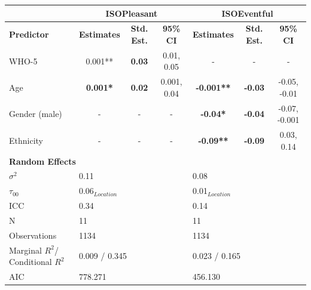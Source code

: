 \begin{landscape}
\begin{table}[hp]
    \begin{tabular}{@{}lcccccc@{}}
    \toprule
                      & \multicolumn{3}{c|}{\textbf{ISOPleasant}}                                        & \multicolumn{3}{c}{\textbf{ISOEventful}}                   \\ 
    \midrule
    \textbf{Predictor} & \textbf{Estimates} & \textbf{Std. Est.} & \multicolumn{1}{c|}{\textbf{95\% CI}} & \textbf{Estimates} & \textbf{Std. Est.} & \textbf{95\% CI} \\
    WHO-5              & 0.001**            & \textbf{0.03}      & \multicolumn{1}{c|}{0.01, 0.05}       & -                  & -                  & -                \\
    Age                & \textbf{0.001*}    & \textbf{0.02}      & \multicolumn{1}{c|}{0.001, 0.04}      & \textbf{-0.001**}  & \textbf{-0.03}     & -0.05, -0.01     \\
    Gender (male)      & -                  & -                  & \multicolumn{1}{c|}{-}                & \textbf{-0.04*}    & \textbf{-0.04}     & -0.07, -0.001    \\
    Ethnicity          & -                  & -                  & \multicolumn{1}{c|}{-}                & \textbf{-0.09**}   & \textbf{-0.09}     & 0.03, 0.14       \\
    \midrule
    \multicolumn{7}{l}{\textbf{Random Effects}} \\ 
    \midrule
    $\sigma^2$         & \multicolumn{3}{l|}{0.11}               & \multicolumn{3}{l}{0.08}              \\
    $\tau_{00}$        & \multicolumn{3}{l|}{0.06$_{Location}$}  & \multicolumn{3}{l}{0.01$_{Location}$} \\
    ICC                & \multicolumn{3}{l|}{0.34}               & \multicolumn{3}{l}{0.14}              \\
    N                  & \multicolumn{3}{l|}{11}                 & \multicolumn{3}{l}{11}                \\
    \midrule
    Observations       & \multicolumn{3}{l|}{1134}               & \multicolumn{3}{l}{1134}          \\
    Marginal $R^2$/%
    Conditional $R^2$  & \multicolumn{3}{l|}{0.009 / 0.345}      & \multicolumn{3}{l}{0.023 / 0.165} \\
    AIC                & \multicolumn{3}{l|}{778.271}            & \multicolumn{3}{l}{456.130}       \\
    \bottomrule
    \end{tabular}
    \end{table}
    \end{landscape}



